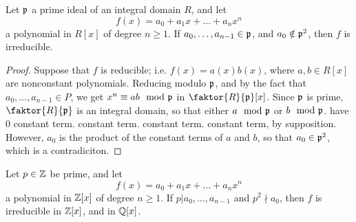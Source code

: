 \begin{theorem}\label{theorem_7.3.4}
    Let $\mathfrak{p}$ a prime ideal of an integral domain $R$, and let
    \begin{equation*}
        f(x)=a_0+a_1x+\dots+a_nx^n
    \end{equation*}
    a polynomial in $R[x]$ of degree $n \geq 1$. If $a_0, \dots, a_{n-1} \in
    \mathfrak{p}$, and $a_0 \notin \mathfrak{p}^2$, then $f$ is irreducible.
\end{theorem}
\begin{proof}
    Suppose that $f$ is reducible; i.e.  $f(x)=a(x)b(x)$, where $a,b \in R[x]$
    are nonconstant polynomials. Reducing modulo $\mathfrak{p}$, and by the fact that
    $a_0, \dots, a_{n-1} \in P$, we get $x^n \equiv ab \mod{\mathfrak{p}}$ in
    $\faktor{R}{\pf}[x]$. Since $\mathfrak{p}$ is prime,  $\faktor{R}{\pf}$ is an integral
    domain, so that either $a \mod{\mathfrak{p}}$ or $b \mod{\mathfrak{p}}$. have $0$ constant term.
    constant term. constant term. constant term, by supposition. However, $a_0$
    is the product of the constant terms of $a$ and $b$, so that $a_0 \in \mathfrak{p}^2$,
    which is a contradiciton.
\end{proof}
\begin{corollary}
    Let $p \in \mathbb{Z}$ be prime, and let
    \begin{equation*}
        f(x)=a_0+a_1x+\dots+a_nx^n
    \end{equation*}
    a polynomial in $\mathbb{Z}[x]$ of degree $n \geq 1$. If $p|a_0, \dots, a_{n-1}$ and
    $p^2 \nmid a_0$, then $f$ is irreducible in  $\mathbb{Z}[x]$, and in $\mathbb{Q}[x]$.
\end{corollary}

